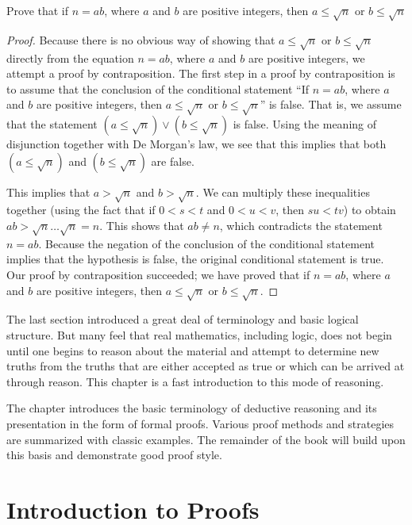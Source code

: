 \begin{example}
Prove that if $n = ab$, where $a$ and $b$ are positive integers, then $a \le \sqrt {n}$ or $b \le \sqrt{n}$
\begin{proof}
Because there is no obvious way of showing that $a \le \sqrt{n}$ or $b \le \sqrt{n}$
 directly from the equation $n = ab$, where $a$ and $b$ are positive integers, we attempt a proof by contraposition.
The first step in a proof by contraposition is to assume that the conclusion of the conditional statement “If $n = ab$, where $a$ and $b$ are positive integers, then $a \le \sqrt{n}$ or $b \le \sqrt{n}$'' is false.  That is, we assume that the statement $(a \le \sqrt{n}) \lor (b \le \sqrt{n})$ is false. Using the meaning of disjunction
together with De Morgan’s law, we see that this implies that both $(a \le \sqrt{n})$ and $(b \le \sqrt{n})$ are false.

This implies that $a > \sqrt{n}$ and $b > \sqrt{n}$. We can multiply these inequalities together (using the fact that if $0 < s < t$ and $0 < u < v$, then $su < tv$) to obtain $ab > \sqrt{n} \dots \sqrt{n} =n$. This shows that $ab \neq n$, which contradicts the statement $n = ab$. Because the negation of the conclusion of the conditional statement implies that the hypothesis is false, the original conditional statement is true. Our proof by contraposition succeeded; we have proved that if $n = ab$, where $a$ and $b$ are positive integers, then $a \le\sqrt{n}$ or $b \le \sqrt{n}$.
\end{proof}
\end{example}


The last section introduced a great deal of terminology and basic logical structure. But many feel that real mathematics, including logic, does not begin until one begins to reason about the material and attempt to determine new truths from the truths that are either accepted as true or which can be arrived at through reason. This chapter is a fast introduction to this mode of reasoning.

The chapter introduces the basic terminology of deductive reasoning and its presentation in the form of formal proofs. Various proof methods and strategies are summarized with classic examples. The remainder of the book will build upon this basis and demonstrate good proof style.

\section {Introduction to Proofs}
